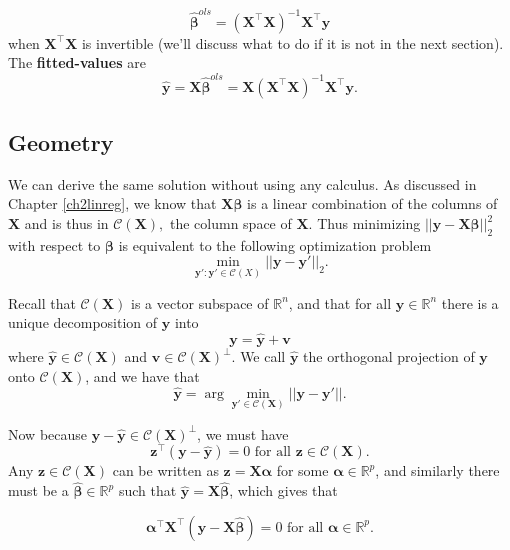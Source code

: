 \documentclass[
]{book}
\theoremstyle{definition}
\theoremstyle{definition}
\theoremstyle{definition}
\theoremstyle{definition}
\theoremstyle{remark}
\begin{document}
\begin{equation}
\hat{\boldsymbol \beta}^{ols}=\left (\mathbf X^\top \mathbf X\right )^{-1}\mathbf X^\top \mathbf y
\label{eq:uni1}
\end{equation}
when \(\mathbf X^\top \mathbf X\) is invertible (we'll discuss what to do if it is not in the next section).
The \textbf{fitted-values} are \[\hat{\mathbf y}= \mathbf X\hat{\boldsymbol \beta}^{ols}=\mathbf X(\mathbf X^\top \mathbf X)^{-1}\mathbf X^\top \mathbf y.\]

\hypertarget{geometry}{%
\subsection{Geometry}\label{geometry}}

We can derive the same solution without using any calculus.
As discussed in Chapter \ref{ch2linreg}, we know that \(\mathbf X\boldsymbol \beta\) is a linear combination of the columns of \(\mathbf X\) and is thus in \(\mathcal{C}(\mathbf X),\) the column space of \(\mathbf X\). Thus minimizing \(||\mathbf y- \mathbf X\boldsymbol \beta||_2^2\) with respect to \(\boldsymbol \beta\) is equivalent to the following optimization problem \[\min_{\mathbf y': \mathbf y' \in \mathcal{C}(X)} ||\mathbf y-\mathbf y'||_2.\]

Recall that \(\mathcal{C}(\mathbf X)\) is a vector subspace of \(\mathbb{R}^n\), and that for all \(\mathbf y\in \mathbb{R}^n\) there is a unique decomposition of \(\mathbf y\) into
\[\mathbf y= \hat{\mathbf y} + \mathbf v\]
where \(\hat{\mathbf y}\in \mathcal{C}(\mathbf X)\) and \(\mathbf v\in \mathcal{C}(\mathbf X)^\perp\). We call \(\hat{\mathbf y}\) the orthogonal projection of \(\mathbf y\) onto \(\mathcal{C}(\mathbf X)\), and we have that
\[\hat{\mathbf y}=\arg \min_{\mathbf y' \in \mathcal{C}(\mathbf X)}||\mathbf y- \mathbf y'||.\]

Now because \(\mathbf y-\hat{\mathbf y}\in \mathcal{C}(\mathbf X)^\perp\), we must have
\[\mathbf z^\top(\mathbf y-\hat{\mathbf y})=0 \mbox{ for all } \mathbf z\in \mathcal{C}(\mathbf X).\]
Any \(\mathbf z\in \mathcal{C}(\mathbf X)\) can be written as \(\mathbf z= \mathbf X\boldsymbol \alpha\) for some \(\boldsymbol \alpha\in \mathbb{R}^p\), and similarly there must be a \(\hat{\boldsymbol \beta}\in \mathbb{R}^p\) such that \(\hat{\mathbf y}=\mathbf X\hat{\boldsymbol \beta}\), which gives that

\[{\boldsymbol \alpha}^\top\mathbf X^\top (\mathbf y-\mathbf X\hat{\boldsymbol \beta})=0 \mbox{ for all } \boldsymbol \alpha\in \mathbb{R}^p.\]
\end{document}
